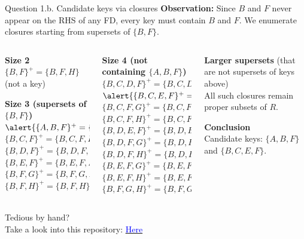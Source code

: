 \documentclass{beamer}
\begin{document}
\begin{frame}{Question 1.b. \; Candidate keys via closures}
\footnotesize
\textbf{Observation:} Since \alert{$B$} and \alert{$F$} never appear on the RHS of any FD, \alert{every key must contain $B$ and $F$}. We enumerate closures starting from supersets of $\{B,F\}$.

\pause
\tiny
\begin{columns}
\begin{column}{0.32\textwidth}
\textbf{Size 2}\\
$\{B,F\}^+ = \{B,F,H\}$ \; (not a key)

\medskip
\textbf{Size 3 (supersets of $\{B,F\}$)}\\
$\alert{\{A,B,F\}^+ = \{A,B,C,D,E,F,G,H\}}$ \\
$\{B,C,F\}^+ = \{B,C,F,H\}$ \\
$\{B,D,F\}^+ = \{B,D,F,H\}$ \\
$\{B,E,F\}^+ = \{B,E,F,H\}$ \\
$\{B,F,G\}^+ = \{B,F,G,H\}$ \\
$\{B,F,H\}^+ = \{B,F,H\}$
\end{column}
\pause
\vspace{0.2em}
\begin{column}{0.34\textwidth}
\textbf{Size 4 (not containing $\{A,B,F\}$)}\\
$\{B,C,D,F\}^+ = \{B,C,D,F,H\}$ \\
$\alert{\{B,C,E,F\}^+ = \{A,B,C,D,E,F,G,H\}}$ \\
$\{B,C,F,G\}^+ = \{B,C,F,G,H\}$ \\
$\{B,C,F,H\}^+ = \{B,C,F,H\}$ \\
$\{B,D,E,F\}^+ = \{B,D,E,F,H\}$ \\
$\{B,D,F,G\}^+ = \{B,D,F,G,H\}$ \\
$\{B,D,F,H\}^+ = \{B,D,F,H\}$ \\
$\{B,E,F,G\}^+ = \{B,E,F,G,H\}$ \\
$\{B,E,F,H\}^+ = \{B,E,F,H\}$ \\
$\{B,F,G,H\}^+ = \{B,F,G,H\}$
\end{column}
\pause
\begin{column}{0.34\textwidth}
\textbf{Larger supersets} (that are not supersets of keys above)\\
All such closures remain proper subsets of $R$.

\medskip
\textbf{Conclusion}\\
\alert{Candidate keys: $\{A,B,F\}$ and $\{B,C,E,F\}$.}
\end{column}
\end{columns}

\medskip
\scriptsize
\begin{center}
    Tedious by hand?\\
Take a look into this repository: \href{https://github.com/pratik2358/fucntional_dep}{\textcolor{blue}{Here}}
\end{center}
\end{frame}
\end{document}
